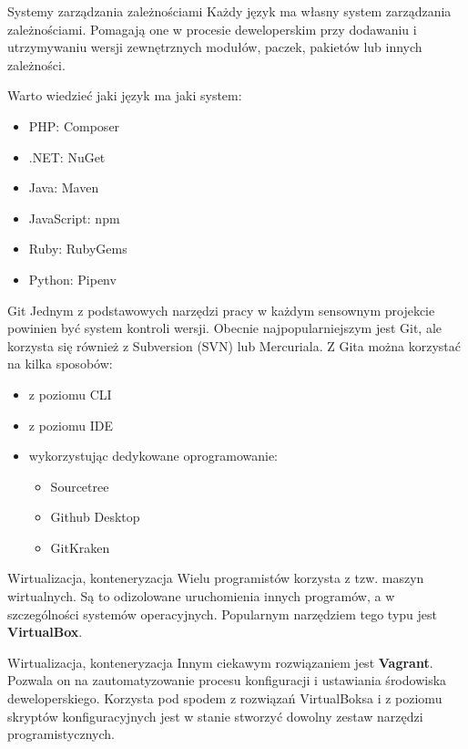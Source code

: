 \begin{frame}{Systemy zarządzania zależnościami}
	Każdy język ma własny system zarządzania zależnościami. Pomagają one w procesie deweloperskim przy dodawaniu i utrzymywaniu wersji zewnętrznych modułów, paczek, pakietów lub innych zależności.
	
	Warto wiedzieć jaki język ma jaki system:

	\begin{itemize}
		\item PHP: Composer
		\item .NET: NuGet
		\item Java: Maven
		\item JavaScript: npm
		\item Ruby: RubyGems
		\item Python: Pipenv
	\end{itemize}
\end{frame}

\begin{frame}{Git}
	Jednym z podstawowych narzędzi pracy w każdym sensownym projekcie powinien być system kontroli wersji. Obecnie najpopularniejszym jest Git, ale korzysta się również z Subversion (SVN) lub Mercuriala. Z Gita można korzystać na kilka sposobów:
	
	\begin{itemize}
		\item z poziomu CLI
		\item z poziomu IDE
		\item wykorzystując dedykowane oprogramowanie:
		\begin{itemize}
			\item Sourcetree
			\item Github Desktop
			\item GitKraken
		\end{itemize}
	\end{itemize}
\end{frame}

\begin{frame}{Wirtualizacja, konteneryzacja}
	Wielu programistów korzysta z tzw. maszyn wirtualnych. Są to odizolowane uruchomienia innych programów, a w szczególności systemów operacyjnych. Popularnym narzędziem tego typu jest \textbf{VirtualBox}.
\end{frame}

\begin{frame}{Wirtualizacja, konteneryzacja}
	Innym ciekawym rozwiązaniem jest \textbf{Vagrant}. Pozwala on na zautomatyzowanie procesu konfiguracji i ustawiania środowiska deweloperskiego. Korzysta pod spodem z rozwiązań VirtualBoksa i z poziomu skryptów konfiguracyjnych jest w stanie stworzyć dowolny zestaw narzędzi programistycznych.
\end{frame}

